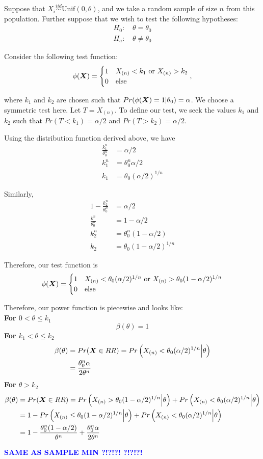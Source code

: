 \documentclass[]{article}
\newcommand{\bfX}{\mbox{\boldmath $X$}}
\begin{document}
Suppose that $X_i \stackrel{iid}{\sim} \text{Unif}(0, \theta)$, and we take a random sample of size $n$ from this population. Further suppose that we wish to test the following hypotheses:
\[
\begin{split}
\text{$H_0$: }& \theta = \theta_0 \\
\text{$H_a$: }& \theta \neq \theta_0
\end{split}
\]

Consider the following test function:
\[
\phi(\bfX) = \begin{cases}
1 & X_{(n)} < k_1 \text{ or } X_{(n)} > k_2 \\
0 & \text{else}
\end{cases},
\]

where $k_1$ and $k_2$ are chosen such that $Pr(\phi(\bfX) = 1|\theta_0) = \alpha$. We choose a symmetric test here. Let $T = X_{(n)}$. To define our test, we seek the values $k_1$ and $k_2$ such that $Pr(T < k_1) = \alpha/2$ and $Pr(T > k_2) = \alpha/2$.

Using the distribution function derived above, we have
\[
\begin{split}
\frac{k_1^n}{\theta_0^n} &= \alpha/2 \\
k_1^n &= \theta_0^n\alpha/2 \\
k_1 &= \theta_0(\alpha/2)^{1/n}
\end{split}
\]

Similarly, 
\[
\begin{split}
1 - \frac{k_2^n}{\theta_0^n} &= \alpha/2 \\
\frac{k^n}{\theta_0^n} &= 1 - \alpha/2 \\
k_2^n &= \theta_0^n(1-\alpha/2) \\
k_2 &= \theta_0(1-\alpha/2)^{1/n}
\end{split}
\]

Therefore, our test function is
\[
\phi(\bfX) = \begin{cases}
1 & X_{(n)} < \theta_0(\alpha/2)^{1/n} \text{ or } X_{(n)} >  \theta_0(1-\alpha/2)^{1/n} \\
0 & \text{else}
\end{cases}
\]

Therefore, our power function is piecewise and looks like:\\
\textbf{For $0 < \theta \leq k_1$}
\[
\beta(\theta) = 1
\]
\textbf{For $k_1 < \theta \leq k_2$}
\[
\begin{split}
\beta(\theta) &= Pr(\bfX \in RR) = Pr\left(X_{(n)} < \theta_0(\alpha/2)^{1/n} \Big| \theta\right) \\
&= \frac{\theta_0^n\alpha}{2\theta^n}
\end{split}
\]
\textbf{For $\theta > k_2$}
\[
\begin{split}
\beta(\theta) &= Pr(\bfX \in RR) = Pr\left(X_{(n)} > \theta_0(1-\alpha/2)^{1/n} \Big| \theta\right) + Pr\left(X_{(n)} < \theta_0(\alpha/2)^{1/n} \Big| \theta\right) \\
&= 1 - Pr\left(X_{(n)}\leq \theta_0(1-\alpha/2)^{1/n} \Big| \theta\right) + Pr\left(X_{(n)} < \theta_0(\alpha/2)^{1/n} \Big| \theta\right) \\
&= 1 - \frac{\theta_0^n(1-\alpha/2)}{\theta^n} + \frac{\theta_0^n\alpha}{2\theta^n}
\end{split}
\]

\textcolor{blue}{\textbf{SAME AS SAMPLE MIN ?!?!?! ?!?!?!}}
\end{document}
